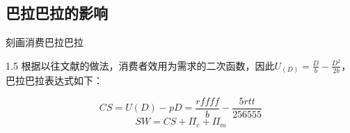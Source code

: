 \documentclass{beamer}
\begin{document}
\subsection{巴拉巴拉的影响}
\begin{frame}{刻画消费巴拉巴拉}
	\begin{small}
		\justifying
		\begin{spacing}{1.5}
			根据以往文献的做法，消费者效用为需求的二次函数，因此$U_{(D)}=\frac{D}{b}-\frac{D^{2}}{2b}$，巴拉巴拉表达式如下：
		\end{spacing}
		\begin{equation*}
			CS=U(D)-pD=\frac{rffff}{b}-\frac{5rtt}{256555}
		\end{equation*}
	\bigskip
		\begin{equation*}
			SW=CS+\Pi_{e}+\Pi_{m}
		\end{equation*}
	\end{small}
\end{frame}
\end{document}
